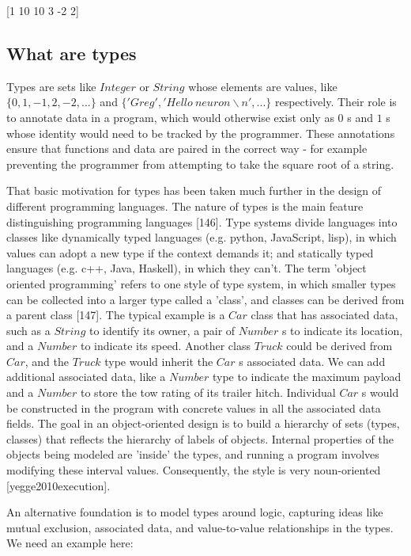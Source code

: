 \documentclass[]{article}
\begin{document}
{[}1 \textbar{} 10 \textbar{} 10 \textbar{} 3 \textbar{} -2 \textbar{}
2{]}

\doublespacing

\subsection{What are types}

Types are sets like \(Integer\) or \(String\) whose elements are values,
like \(\{0, 1, -1, 2, -2, ...\}\) and
\(\{'Greg', 'Hello\ neuron\backslash n', ...\}\) respectively. Their
role is to annotate data in a program, which would otherwise exist only
as \(0\) s and \(1\) s whose identity would need to be tracked by the
programmer. These annotations ensure that functions and data are paired
in the correct way - for example preventing the programmer from
attempting to take the square root of a string.

That basic motivation for types has been taken much further in the
design of different programming languages. The nature of types is the
main feature distinguishing programming languages {[}146{]}. Type
systems divide languages into classes like dynamically typed languages
(e.g. python, JavaScript, lisp), in which values can adopt a new type if
the context demands it; and statically typed languages (e.g. c++, Java,
Haskell), in which they can't. The term 'object oriented programming'
refers to one style of type system, in which smaller types can be
collected into a larger type called a 'class', and classes can be
derived from a parent class {[}147{]}. The typical example is a \(Car\)
class that has associated data, such as a \(String\) to identify its
owner, a pair of \(Number\) s to indicate its location, and a \(Number\)
to indicate its speed. Another class \(Truck\) could be derived from
\(Car\), and the \(Truck\) type would inherit the \(Car\) s associated
data. We can add additional associated data, like a \(Number\) type to
indicate the maximum payload and a \(Number\) to store the tow rating of
its trailer hitch. Individual \(Car\) s would be constructed in the
program with concrete values in all the associated data fields. The goal
in an object-oriented design is to build a hierarchy of sets (types,
classes) that reflects the hierarchy of labels of objects. Internal
properties of the objects being modeled are 'inside' the types, and
running a program involves modifying these interval values.
Consequently, the style is very noun-oriented {[}yegge2010execution{]}.

An alternative foundation is to model types around logic, capturing
ideas like mutual exclusion, associated data, and value-to-value
relationships in the types. We need an example here:
\end{document}
